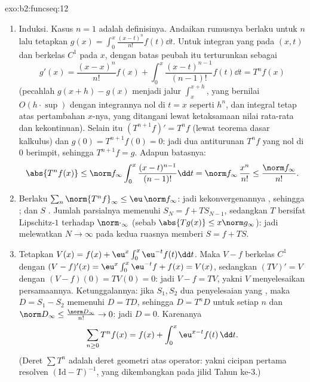 \begin{solution}{exo:b2:funcseq:12}
\begin{enumerate}
  \item Induksi. Kasus $n = 1$ adalah definisinya. Andaikan rumusnya
        berlaku untuk $n$ lalu tetapkan $g(x) = \int_0^x
        \frac{(x-t)^n}{n!} f(t)\dd t$. Untuk integran yang  pada
        $(x,t)$ dan berkelas $C^1$ pada $x$, 
        dengan batas peubah itu terturunkan sebagai
        \[
        g'(x) = \frac{(x-x)^n}{n!}f(x)
        + \int_0^x \frac{(x-t)^{n-1}}{(n-1)!}f(t)\dd t
        = T^nf(x)
        \]
        (pecahlah $g(x+h) - g(x)$ menjadi jalur
        $\int_x^{x+h}$, yang bernilai $O(h\cdot\sup)$ dengan
        integrannya nol di $t = x$ seperti $h^n$, dan integral tetap
        atas pertambahan $x$-nya, yang ditangani lewat ketaksamaan nilai
        rata-rata dan kekontinuan). Selain itu $(T^{n+1}f)' = T^nf$
        (lewat teorema dasar kalkulus) dan $g(0) = T^{n+1}f(0) = 0$: jadi
        dua antiturunan $T^nf$ yang nol di $0$ berimpit, sehingga
        $T^{n+1}f = g$. Adapun batasnya:
        \[
        \abs{T^nf(x)} \leq \norm f_\infty
        \int_0^x \frac{(x-t)^{n-1}}{(n-1)!}\dd t
        = \norm f_\infty\,\frac{x^n}{n!}
        \leq \frac{\norm f_\infty}{n!} .
        \]
  \item Berlaku $\sum_n \norm{T^nf}_\infty \leq \eu\,\norm f_\infty$:
        jadi kekonvergenannya , sehingga ; dan $S$ .
        Jumlah parsialnya memenuhi $S_N = f + T S_{N-1}$, sedangkan $T$
        bersifat Lipschitz-$1$ terhadap $\norm\cdot_\infty$ (sebab
        $\abs{Tg(x)} \leq x\norm g_\infty$): jadi melewatkan $N \to
        \infty$ pada kedua ruasnya memberi $S = f + TS$.
  \item Tetapkan $V(x) = f(x) + \eu^x\int_0^x \eu^{-t}f(t)\dd t$.
        Maka $V - f$ berkelas $C^1$ dengan $(V-f)'(x) =
        \eu^x\int_0^x\eu^{-t}f + f(x) = V(x)$, sedangkan $(TV)' = V$
        dengan $(V - f)(0) = TV(0) = 0$: jadi $V - f = TV$, yakni
        $V$ menyelesaikan persamaannya. Ketunggalannya: jika $S_1, S_2$
        dua penyelesaian yang , maka $D = S_1 - S_2$ memenuhi $D
        = TD$, sehingga $D = T^nD$ untuk setiap $n$ dan $\norm D_\infty
        \leq \frac{\norm D_\infty}{n!} \to 0$: jadi $D = 0$.
        Karenanya
        \[
        \sum_{n\geq0} T^nf(x) = f(x) +
        \int_0^x \eu^{x-t}f(t)\,\dd t .
        \]
        (Deret $\sum T^n$ adalah deret geometri atas
        operator: yakni cicipan pertama resolven
        $(\mathrm{Id} - T)^{-1}$, yang dikembangkan pada jilid Tahun
        ke-3.)
\end{enumerate}
\end{solution}

